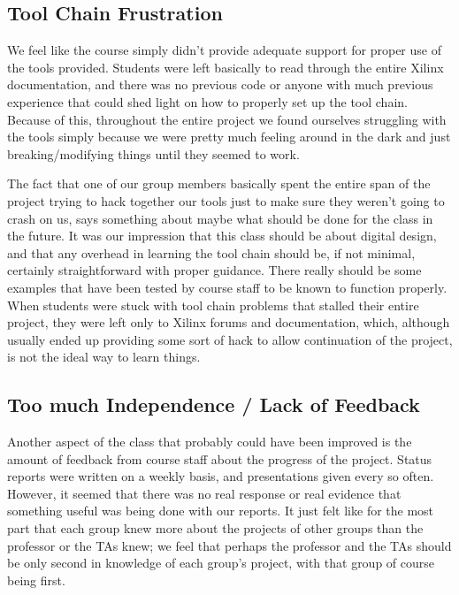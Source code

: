 \documentclass[letterpaper,10pt]{article}
\begin{document}
\subsection{Tool Chain Frustration}

We feel like the course simply didn't provide adequate support for proper use of the tools provided. Students were left basically to read through the entire Xilinx documentation, and there was no previous code or anyone with much previous experience that could shed light on how to properly set up the tool chain. Because of this, throughout the entire project we found ourselves struggling with the tools simply because we were pretty much feeling around in the dark and just breaking/modifying things until they seemed to work.

The fact that one of our group members basically spent the entire span of the project trying to hack together our tools just to make sure they weren't going to crash on us, says something about maybe what should be done for the class in the future. It was our impression that this class should be about digital design, and that any overhead in learning the tool chain should be, if not minimal, certainly straightforward with proper guidance. There really should be some examples that have been tested by course staff to be known to function properly. When students were stuck with tool chain problems that stalled their entire project, they were left only to Xilinx forums and documentation, which, although usually ended up providing some sort of hack to allow continuation of the project, is not the ideal way to learn things. 

\subsection{Too much Independence / Lack of Feedback}

Another aspect of the class that probably could have been improved is the amount of feedback from course staff about the progress of the project. Status reports were written on a weekly basis, and presentations given every so often. However, it seemed that there was no real response or real evidence that something useful was being done with our reports. It just felt like for the most part that each group knew more about the projects of other groups than the professor or the TAs knew; we feel that perhaps the professor and the TAs should be only second in knowledge of each group's project, with that group of course being first.
\end{document}
